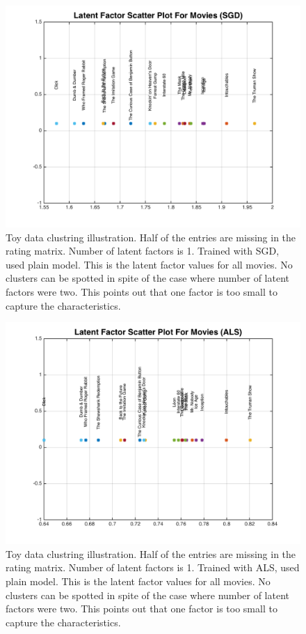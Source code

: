 \documentclass[11pt]{article}
\begin{document}
	
	
	
	\begin{figure}[H]
		\centering		
		\includegraphics[width=\wiq]{buff3/1}
		\caption{Toy data clustring illustration. Half of the entries are missing in the rating matrix. Number of latent factors is 1. Trained with SGD, used plain model. This is the latent factor values for all movies. No clusters can be spotted in spite of the case where number of latent factors were two. This points out that one factor is too small to capture the characteristics.}
		\label{5}		
	\end{figure}
	\begin{figure}[H]
		\centering		
		\includegraphics[width=\wiq]{buff3/2}
		\caption{Toy data clustring illustration. Half of the entries are missing in the rating matrix. Number of latent factors is 1. Trained with ALS, used plain model. This is the latent factor values for all movies. No clusters can be spotted in spite of the case where number of latent factors were two. This points out that one factor is too small to capture the characteristics.}
		\label{5}		
	\end{figure}
\end{document}
